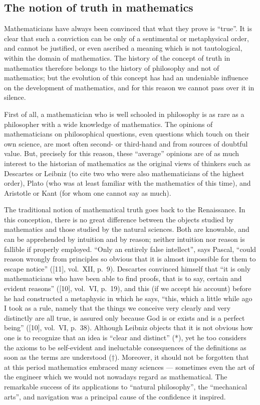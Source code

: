 \subsection*{The notion of truth in mathematics}

Mathematicians have always been convinced that what they prove is ``true''. It is clear that such a conviction can be only of a sentimental or metaphysical order, and cannot be justified, or even ascribed a meaning which is not tautological, within the domain of mathematics. The history of the concept of truth in mathematics therefore belongs to the history of philosophy and not of mathematics; but the evolution of this concept has had an undeniable influence on the development of mathematics, and for this reason we cannot pass over it in silence.

First of all, a mathematician who is well schooled in philosophy is as rare as a philosopher with a wide knowledge of mathematics. The opinions of mathematicians on philosophical questions, even questions which touch on their own science, are most often second- or third-hand and from sources of doubtful value. But, precisely for this reason, these ``average'' opinions are of as much interest to the historian of mathematics as the original views of thinkers such as Descartes or Leibniz (to cite two who were also mathematicians of the highest order), Plato (who was at least familiar with the mathematics of this time), and Aristotle or Kant (for whom one cannot say as much).

The traditional notion of mathematical truth goes back to the Renaissance. In this conception, there is no great difference between the objects studied by mathematics and those studied by the natural sciences. Both are knowable, and can be apprehended by intuition and by reason; neither intuition nor reason is fallible if properly employed. ``Only an entirely false intellect'', says Pascal, ``could reason wrongly from principles so obvious that it is almost impossible for them to escape notice'' ({[}11{]}, vol.~XII, p.~9). Descartes convinced himself that ``it is only mathematicians who have been able to find proofs, that is to say, certain and evident reasons'' ({[}10{]}, vol.~VI, p.~19), and this (if we accept his account) before he had constructed a metaphysic in which he says, ``this, which a little while ago I took as a rule, namely that the things we conceive very clearly and very distinctly are all true, is assured only because God is or exists and is a perfect being'' ({[}10{]}, vol.~VI, p.~38). Although Leibniz objects that it is not obvious how one is to recognize that an idea is ``clear and distinct'' (*), yet he too considers the axioms to be self-evident and ineluctable consequences of the definitions as soon as the terms are understood (†). Moreover, it should not be forgotten that at this period mathematics embraced many sciences --- sometimes even the art of the engineer which we would not nowadays regard as mathematical. The remarkable success of its applications to ``natural philosophy'', the ``mechanical arts'', and navigation was a principal cause of the confidence it inspired.


